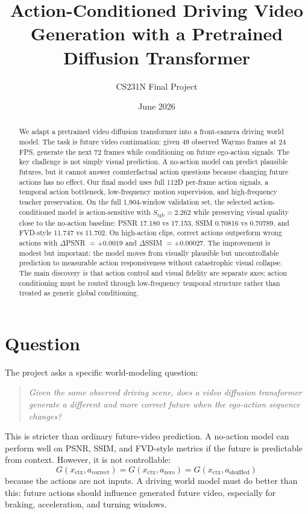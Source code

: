 \documentclass[10pt]{article}
\title{\vspace{-0.55in}\textbf{Action-Conditioned Driving Video Generation with a Pretrained Diffusion Transformer}}
\author{CS231N Final Project}
\date{June 2026}
\begin{document}
\maketitle
\vspace{-0.45in}

\begin{abstract}
We adapt a pretrained video diffusion transformer into a front-camera driving world model. The task is future video continuation: given 49 observed Waymo frames at 24 FPS, generate the next 72 frames while conditioning on future ego-action signals. The key challenge is not simply visual prediction. A no-action model can predict plausible futures, but it cannot answer counterfactual action questions because changing future actions has no effect. Our final model uses full 112D per-frame action signals, a temporal action bottleneck, low-frequency motion supervision, and high-frequency teacher preservation. On the full 1,904-window validation set, the selected action-conditioned model is action-sensitive with $S_{\mathrm{rgb}}=2.262$ while preserving visual quality close to the no-action baseline: PSNR 17.180 vs 17.153, SSIM 0.70816 vs 0.70789, and FVD-style 11.747 vs 11.702. On high-action clips, correct actions outperform wrong actions with $\Delta$PSNR $=+0.0019$ and $\Delta$SSIM $=+0.00027$. The improvement is modest but important: the model moves from visually plausible but uncontrollable prediction to measurable action responsiveness without catastrophic visual collapse. The main discovery is that action control and visual fidelity are separate axes; action conditioning must be routed through low-frequency temporal structure rather than treated as generic global conditioning.
\end{abstract}

\section{Question}

The project asks a specific world-modeling question:
\begin{quote}
\emph{Given the same observed driving scene, does a video diffusion transformer generate a different and more correct future when the ego-action sequence changes?}
\end{quote}

This is stricter than ordinary future-video prediction. A no-action model can perform well on PSNR, SSIM, and FVD-style metrics if the future is predictable from context. However, it is not controllable:
\[
G(x_{\mathrm{ctx}}, a_{\mathrm{correct}})
=
G(x_{\mathrm{ctx}}, a_{\mathrm{zero}})
=
G(x_{\mathrm{ctx}}, a_{\mathrm{shuffled}})
\]
because the actions are not inputs. A driving world model must do better than this: future actions should influence generated future video, especially for braking, acceleration, and turning windows.
\end{document}
